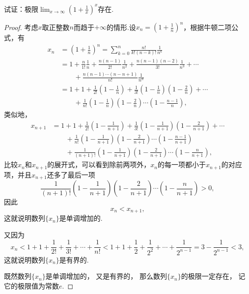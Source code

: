 \begin{example}[重要极限II]
试证：极限\(\lim_{x \to \infty}\left(1 + \frac{1}{x}\right)^x\)存在.
\begin{proof}
考虑\(x\)取正整数\(n\)而趋于\(+\infty\)的情形.设\(x_n=\left(1+\frac{1}{n}\right)^n\)，根据牛顿二项公式，有\begin{align*}
x_n &= \left(1+\frac{1}{n}\right)^n
= \sum_{k=0}^n \frac{n!}{k! (n-k)!} \frac{1}{n^k} \\
&= 1 + \frac{n}{1!}\frac{1}{n} + \frac{n(n-1)}{2!}\frac{1}{n^2} + \frac{n(n-1)(n-2)}{3!}\frac{1}{n^3} + \dotsb \\
&\qquad+ \frac{n(n-1)\dotsm(n-n+1)}{n!}\frac{1}{n^n} \\
&= 1 + 1 + \frac{1}{2!}\left(1-\frac{1}{n}\right) + \frac{1}{3!}\left(1-\frac{1}{n}\right)\left(1-\frac{2}{n}\right) + \dotsb \\
&\qquad+ \frac{1}{n!}\left(1-\frac{1}{n}\right)\left(1-\frac{2}{n}\right)\dotsm\left(1-\frac{n-1}{n}\right),
\end{align*}
类似地，\begin{align*}
x_{n+1}
&= 1 + 1 + \frac{1}{2!}\left(1-\frac{1}{n+1}\right) + \frac{1}{3!}\left(1-\frac{1}{n+1}\right)\left(1-\frac{2}{n+1}\right) + \dotsb \\
&\qquad+ \frac{1}{n!}\left(1-\frac{1}{n+1}\right)\left(1-\frac{2}{n+1}\right)\dotsm\left(1-\frac{n-1}{n+1}\right) \\
&\qquad+ \frac{1}{(n+1)!}\left(1-\frac{1}{n+1}\right)\left(1-\frac{2}{n+1}\right)\dotsm\left(1-\frac{n}{n+1}\right),
\end{align*}
比较\(x_n\)和\(x_{n+1}\)的展开式，可以看到除前两项外，\(x_n\)的每一项都小于\(x_{n+1}\)的对应项，并且\(x_{n+1}\)还多了最后一项\[
\frac{1}{(n+1)!}\left(1-\frac{1}{n+1}\right)\left(1-\frac{2}{n+1}\right)\dotsm\left(1-\frac{n}{n+1}\right) > 0,
\]因此\[
x_n < x_{n+1},
\]这就说明数列\(\{x_n\}\)是单调增加的.

又因为\[
x_n < 1 + 1 + \frac{1}{2!} + \frac{1}{3!} + \dotsb + \frac{1}{n!}
< 1 + 1 + \frac{1}{2} + \frac{1}{2^2} + \dotsb + \frac{1}{2^{n-1}}
= 3 - \frac{1}{2^{n-1}} < 3,
\]这就说明数列\(\{x_n\}\)是有界的.

既然数列\(\{x_n\}\)是单调增加的，
又是有界的，
那么数列\(\{x_n\}\)的极限一定存在，
记它的极限值为常数\(e\).


\end{proof}
\end{example}
